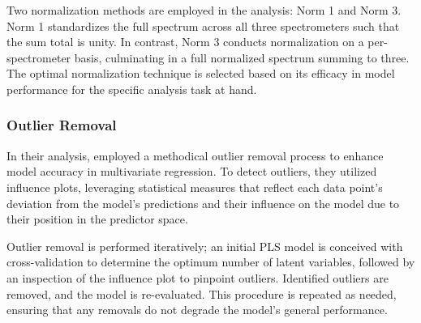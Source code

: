 Two normalization methods are employed in the analysis: Norm 1 and Norm 3.
Norm 1 standardizes the full spectrum across all three spectrometers such that the sum total is unity.
In contrast, Norm 3 conducts normalization on a per-spectrometer basis, culminating in a full normalized spectrum summing to three.
The optimal normalization technique is selected based on its efficacy in model performance for the specific analysis task at hand.

\subsubsection{Outlier Removal}\label{sec:outlier_removal}

In their analysis, \citet{andersonImprovedAccuracyQuantitative2017} employed a methodical outlier removal process to enhance model accuracy in multivariate regression. To detect outliers, they utilized influence plots, leveraging statistical measures that reflect each data point's deviation from the model's predictions and their influence on the model due to their position in the predictor space.


Outlier removal is performed iteratively; an initial PLS model is conceived with cross-validation to determine the optimum number of latent variables, followed by an inspection of the influence plot to pinpoint outliers. Identified outliers are removed, and the model is re-evaluated. This procedure is repeated as needed, ensuring that any removals do not degrade the model's general performance.


